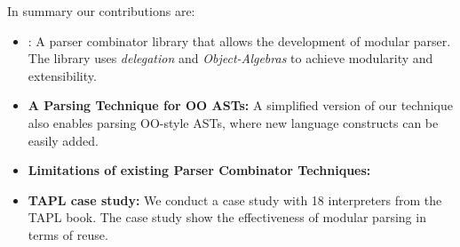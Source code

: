 In summary our contributions are:

\begin{itemize}

\item {\name:} A parser combinator library that allows the development 
of modular parser. The library uses \emph{delegation} and
\emph{Object-Algebras} to achieve modularity and extensibility.

\item {{\bf A Parsing Technique for OO ASTs:}} A simplified version of
  our technique also enables parsing OO-style ASTs, where new language
  constructs can be easily added.

\item {{\bf Limitations of existing Parser Combinator Techniques:}}

\item {{\bf TAPL case study:}} We conduct a case study with 18 interpreters
  from the TAPL book. The case study show the effectiveness of modular 
  parsing in terms of reuse.

\end{itemize}



